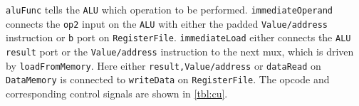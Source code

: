 \documentclass[a4paper, english]{article}
\numberwithin{equation}{section}
\begin{document}
\texttt{aluFunc} tells the \texttt{ALU} which operation to be performed. \texttt{immediateOperand} connects the \texttt{op2} input on the \texttt{ALU} with either the padded \texttt{Value/address} instruction or \texttt{b} port on \texttt{RegisterFile}.\newline
\texttt{immediateLoad} either connects the \texttt{ALU} \texttt{result} port or the \texttt{Value/address} instruction to the next mux, which is driven by \texttt{loadFromMemory}. Here either \texttt{result,Value/address} or \texttt{dataRead} on \texttt{DataMemory} is connected to \texttt{writeData} on \texttt{RegisterFile}.\newline
The opcode and corresponding control signals are shown in \cref{tbl:cu}.
\begin{table}[H]
    \centering
    \caption{ControlUnit control bits}\label{tbl:cu}
\end{table}
\end{document}
